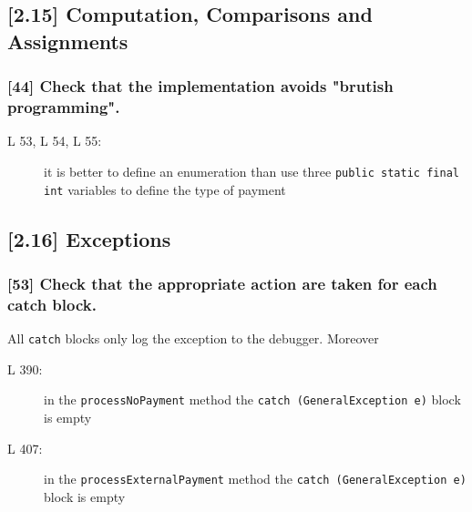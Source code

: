 \subsection*{[2.15] Computation, Comparisons and Assignments}
\subsubsection*{[44] Check that the implementation avoids "brutish programming".}
\begin{description}
	\item[L 53, L 54, L 55:] it is better to define an enumeration than use three {\tt public static final int} variables to define the type of payment
\end{description}

\subsection*{[2.16] Exceptions}
\subsubsection*{[53] Check that the appropriate action are taken for each catch block.}
All {\tt catch} blocks only log the exception to the debugger. Moreover
\begin{description}
	\item[L 390:] in the {\tt processNoPayment} method the {\tt catch (GeneralException e)} block is empty
	\item[L 407:] in the {\tt processExternalPayment} method the \mbox{{\tt catch (GeneralException e)}} block is empty
\end{description}